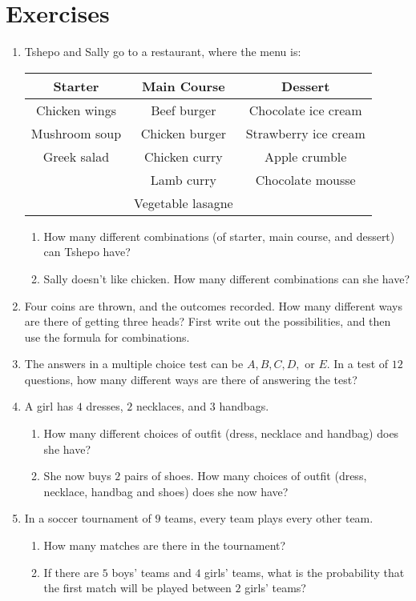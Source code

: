 \section{Exercises}
\begin{enumerate}
\item Tshepo and Sally go to a restaurant, where the menu is:\\
\begin{tabular}{|c|c|c|}
\hline
Starter & Main Course & Dessert \\
\hline
Chicken wings & Beef burger & Chocolate ice cream \\
Mushroom soup & Chicken burger &  Strawberry ice cream\\
Greek salad & Chicken curry &  Apple crumble\\
 & Lamb curry & Chocolate mousse\\
 & Vegetable lasagne & \\
\hline
\end{tabular}

\begin{enumerate}
\item How many different combinations (of starter, main course, and dessert) can Tshepo have?
\item Sally doesn't like chicken.  How many different combinations can she have?
\end{enumerate}

\item Four coins are thrown, and the outcomes recorded. How many different ways are there of getting three heads? First write out the possibilities, and then use the formula for combinations.

\item The answers in a multiple choice test can be $A, B, C, D,$ or $E$. In a test of $12$ questions, how many different ways are there of answering the test?

\item A girl has $4$ dresses, $2$ necklaces, and $3$ handbags. 
\begin{enumerate} \item How many different choices of outfit (dress, necklace and handbag) does she have?
\item She now buys $2$ pairs of shoes. How many choices of outfit (dress, necklace, handbag and shoes) does she now have?
\end{enumerate}

\item In a soccer tournament of $9$ teams, every team plays every other team. 
\begin{enumerate}
\item How many matches are there in the tournament?
\item If there are $5$ boys' teams and $4$ girls' teams, what is the probability that the first match will be played between $2$ girls' teams?
\end{enumerate}


\end{enumerate}
